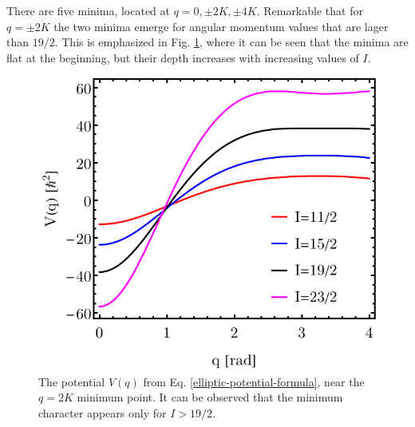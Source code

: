 There are five minima, located at $q=0,\pm2K,\pm4K$. Remarkable that for $q=\pm2K$ the two minima emerge for angular momentum values that are lager than $19/2$. This is emphasized in Fig. \ref{elliptic-potential-plot-2k-minima}, where it can be seen that the minima are flat at the beginning, but their depth increases with increasing values of $I$.
\begin{figure}
    \centering
    \includegraphics[scale=0.85]{Chapters/Figures/Elliptic-Potential-2K-Minima.pdf}
    \caption{The potential $V(q)$ from Eq. \ref{elliptic-potential-formula}, near the $q=2K$ minimum point. It can be observed that the minimum character appears only for $I>19/2$.}
    \label{elliptic-potential-plot-2k-minima}
\end{figure}

